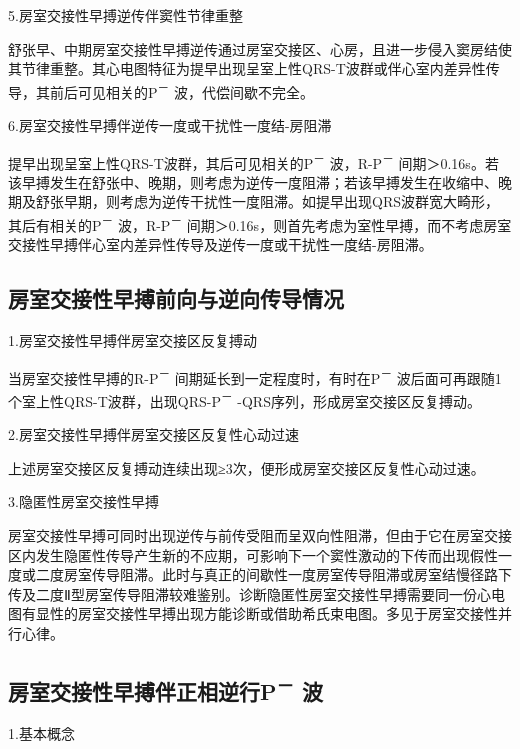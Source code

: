 5.房室交接性早搏逆传伴窦性节律重整

舒张早、中期房室交接性早搏逆传通过房室交接区、心房，且进一步侵入窦房结使其节律重整。其心电图特征为提早出现呈室上性QRS-T波群或伴心室内差异性传导，其前后可见相关的P\textsuperscript{－}
波，代偿间歇不完全。

6.房室交接性早搏伴逆传一度或干扰性一度结-房阻滞

提早出现呈室上性QRS-T波群，其后可见相关的P\textsuperscript{－}
波，R-P\textsuperscript{－}
间期＞0.16s。若该早搏发生在舒张中、晚期，则考虑为逆传一度阻滞；若该早搏发生在收缩中、晚期及舒张早期，则考虑为逆传干扰性一度阻滞。如提早出现QRS波群宽大畸形，其后有相关的P\textsuperscript{－}
波，R-P\textsuperscript{－}
间期＞0.16s，则首先考虑为室性早搏，而不考虑房室交接性早搏伴心室内差异性传导及逆传一度或干扰性一度结-房阻滞。

\protect\hypertarget{text00018.htmlux5cux23subid148}{}{}

\subsection{房室交接性早搏前向与逆向传导情况}

1.房室交接性早搏伴房室交接区反复搏动

当房室交接性早搏的R-P\textsuperscript{－}
间期延长到一定程度时，有时在P\textsuperscript{－}
波后面可再跟随1个室上性QRS-T波群，出现QRS-P\textsuperscript{－}
-QRS序列，形成房室交接区反复搏动。

2.房室交接性早搏伴房室交接区反复性心动过速

上述房室交接区反复搏动连续出现≥3次，便形成房室交接区反复性心动过速。

3.隐匿性房室交接性早搏

房室交接性早搏可同时出现逆传与前传受阻而呈双向性阻滞，但由于它在房室交接区内发生隐匿性传导产生新的不应期，可影响下一个窦性激动的下传而出现假性一度或二度房室传导阻滞。此时与真正的间歇性一度房室传导阻滞或房室结慢径路下传及二度Ⅱ型房室传导阻滞较难鉴别。诊断隐匿性房室交接性早搏需要同一份心电图有显性的房室交接性早搏出现方能诊断或借助希氏束电图。多见于房室交接性并行心律。

\protect\hypertarget{text00018.htmlux5cux23subid149}{}{}

\subsection{房室交接性早搏伴正相逆行P\textsuperscript{－} 波}

1.基本概念

